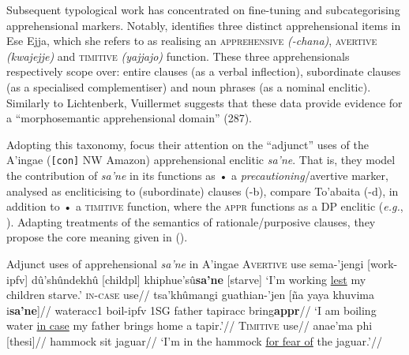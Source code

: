 Subsequent typological work has concentrated on fine-tuning and subcategorising apprehensional markers. Notably, \citet{Vuillermet2018} identifies three distinct apprehensional items in Ese Ejja, which she refers to as realising an \textsc{apprehensive} \textit{(-chana)}, \textsc{avertive} \textit{(kwajejje)} and \textsc{timitive} \textit{(\textdblhyphen yajjajo)} function. These three apprehensionals respectively scope over: entire clauses (as a verbal inflection), subordinate clauses (as a specialised complementiser) and noun phrases (as a nominal enclitic). Similarly to Lichtenberk, Vuillermet suggests that these data provide evidence for a ``morphosemantic apprehensional domain'' (287).

Adopting this taxonomy, \cite{AnderBois2020} focus their attention on the ``adjunct'' uses of the A'ingae (\texttt{[con]} NW Amazon) apprehensional enclitic \textit{\textdblhyphen sa'ne}. That is, they model the contribution of \textit{\textdblhyphen sa'ne} in its functions as • a \textit{precautioning}/avertive marker, analysed as encliticising to (subordinate) clauses (-b), compare To'abaita (-d), in addition to • a \textsc{timitive} function, where the \textsc{appr} functions as a DP enclitic (\textit{e.g.}, ). Adapting treatments of the semantics of rationale/purposive clauses, they propose the core meaning given in ().


\pex Adjunct uses of apprehensional \textit{\textdblhyphen sa'ne} in A'ingae
\a\begingl[glstyle=nlevel] 
\glpreamble \textsc{Avertive} use\endpreamble
sema-’je\textdblhyphen{}ngi [work-\gls{ipfv}]
dû’shû\textdblhyphen{}ndekhû [child\textdblhyphen \gls{pl}]
khiphue’sû\textbf{\textdblhyphen{}sa’ne }[starve]
\glft‘I'm working \ul{lest} my children starve.'
\endgl
\a\begingl\glpreamble \textsc{in-case} use//
\gla tsa’khû\textdblhyphen{}ma\textdblhyphen{}ngi guathian-’jen [ña yaya khuvi\textdblhyphen{}ma i\textbf{\textdblhyphen{}sa’ne}]//
\glb water\textdblhyphen{}\gls{acc}\textdblhyphen{}1 boil-\gls{ipfv} 1SG father tapir\textdblhyphen\gls{acc} bring\textdblhyphen\textbf{\gls{appr}}//
\glft‘I am boiling water \ul{in case} my father brings home a tapir.’//\endgl
\a\begingl\glpreamble \textsc{Timitive} use//
\gla anae'ma phi [thesi\textbf{}]//
\glb hammock sit jaguar//
\glft`I'm in the hammock \ul{for fear of} the jaguar.'//
\endgl
\xe

